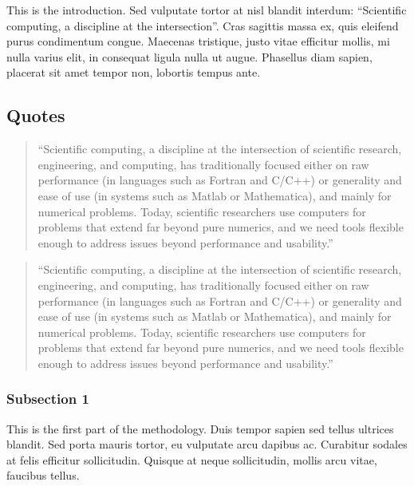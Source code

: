 This is the introduction. Sed vulputate tortor at nisl blandit
interdum: \enquote{Scientific computing, a discipline at the
intersection}\autocite[13]{Perez_Python_2011}. Cras sagittis massa
ex, quis eleifend purus condimentum congue. Maecenas tristique,
justo vitae efficitur mollis, mi nulla varius elit, in consequat
ligula nulla ut augue. Phasellus diam sapien, placerat sit amet
tempor non, lobortis tempus ante.

\hypertarget{quotes}{%
\subsection{Quotes}\label{quotes}}

\begin{quote}
\enquote{Scientific computing, a discipline at the intersection of
scientific research, engineering, and computing, has traditionally
focused either on raw performance (in languages such as Fortran and
C/C++) or generality and ease of use (in systems such as Matlab or
Mathematica), and mainly for numerical problems. Today, scientific
researchers use computers for problems that extend far beyond pure
numerics, and we need tools flexible enough to address issues beyond
performance and usability.}

\autocite[13]{Perez_PythonEcosystem_2011}
\end{quote}


\blockcquote{Perez_PythonEcosystem_2011}{\enquote{Scientific computing, a discipline at the intersection of scientific research, engineering, and computing, has traditionally focused either on raw performance (in languages such as Fortran and C/C++) or generality and ease of use (in systems such as Matlab or Mathematica), and mainly for numerical problems. Today, scientific researchers use computers for problems that extend far beyond pure numerics, and we need tools flexible enough to address issues beyond performance and usability.}}

\hypertarget{subsection-1}{%
\subsubsection{Subsection 1}\label{subsection-1}}

This is the first part of the methodology. Duis tempor sapien sed
tellus ultrices blandit. Sed porta mauris tortor, eu vulputate arcu
dapibus ac. Curabitur sodales at felis efficitur sollicitudin.
Quisque at neque sollicitudin, mollis arcu vitae, faucibus tellus.

